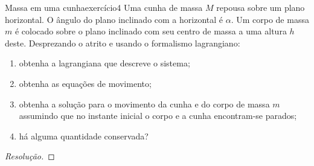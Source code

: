 \begin{exercício}{Massa em uma cunha}{exercício4}
    Uma cunha de massa \(M\) repousa sobre um plano horizontal. O ângulo do plano inclinado com a horizontal é \(\alpha\). Um corpo de massa \(m\) é colocado sobre o plano inclinado com seu centro de massa a uma altura \(h\) deste. Desprezando o atrito e usando o formalismo lagrangiano:
    \begin{enumerate}[label=(\alph*)]
        \item obtenha a lagrangiana que descreve o sistema;
        \item obtenha as equações de movimento;
        \item obtenha a solução para o movimento da cunha e do corpo de massa \(m\) assumindo que no instante inicial o corpo e a cunha encontram-se parados;
        \item há alguma quantidade conservada?
    \end{enumerate}
\end{exercício}
\begin{proof}[Resolução]

\end{proof}
